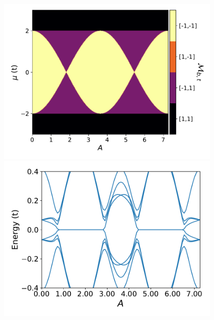 \documentclass[xcolor=dvipsnames,10pt,aspectratio=169]{beamer}
\begin{document}
\begin{frame}
\begin{columns}
      \pause

      \begin{figure}
        \includegraphics[height=0.45\textheight]{./figures/topological-phase-diagram-1pi3-w-1.pdf} \\
        \hspace{-10mm}
        \pause
        \includegraphics[height=0.39\textheight]{./figures/spectral-flow-nr-50-w-1-mu-1_6.pdf}
      \end{figure}
    \end{columns}

  \end{frame}
\end{document}
